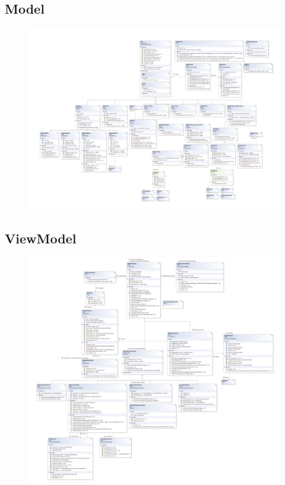 \subsection{Model}
\begin{figure}[h!]
\begin{center}
\includegraphics[width=0.9\textheight,angle=90]{classdiagram/model.png}
\end{center}
\end{figure}
\newpage

\subsection{ViewModel}
\begin{figure}[h!]
\begin{center}
\includegraphics[width=0.9\textheight,angle=90]{classdiagram/viewmodel.png}
\end{center}
\end{figure}
\newpage

